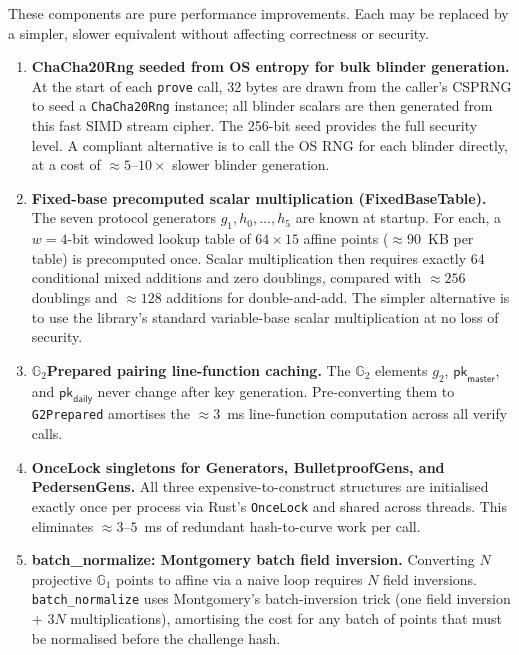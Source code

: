 \documentclass[11pt]{article}
\theoremstyle{definitionstyle}
\theoremstyle{plain}
\begin{document}
These components are pure performance improvements.  Each may be replaced by
a simpler, slower equivalent without affecting correctness or security.

\begin{enumerate}[leftmargin=*,label=\textbf{O\arabic*.}]

\item \textbf{ChaCha20Rng seeded from OS entropy for bulk blinder generation.}
  At the start of each \texttt{prove} call, 32 bytes are drawn from the
  caller's CSPRNG to seed a \texttt{ChaCha20Rng} instance; all blinder
  scalars are then generated from this fast SIMD stream cipher.  The 256-bit
  seed provides the full security level.  A compliant alternative is to call
  the OS RNG for each blinder directly, at a cost of $\approx 5$--$10\times$
  slower blinder generation.

\item \textbf{Fixed-base precomputed scalar multiplication (FixedBaseTable).}
  The seven protocol generators $g_1, h_0, \ldots, h_5$ are known at startup.
  For each, a $w=4$-bit windowed lookup table of $64 \times 15$ affine points
  ($\approx 90$~KB per table) is precomputed once.  Scalar multiplication
  then requires exactly 64 conditional mixed additions and zero doublings,
  compared with $\approx 256$ doublings and $\approx 128$ additions for
  double-and-add.  The simpler alternative is to use the library's standard
  variable-base scalar multiplication at no loss of security.

\item \textbf{$\mathbb{G}_2$Prepared pairing line-function caching.}
  The $\mathbb{G}_2$ elements $g_2$, $\mathsf{pk}_{\mathsf{master}}$, and
  $\mathsf{pk}_{\mathsf{daily}}$ never change after key generation.
  Pre-converting them to \texttt{G2Prepared} amortises the $\approx 3$~ms
  line-function computation across all verify calls.

\item \textbf{OnceLock singletons for Generators, BulletproofGens, and PedersenGens.}
  All three expensive-to-construct structures are initialised exactly once
  per process via Rust's \texttt{OnceLock} and shared across threads.  This
  eliminates $\approx 3$--$5$~ms of redundant hash-to-curve work per call.

\item \textbf{batch\_normalize: Montgomery batch field inversion.}
  Converting $N$ projective $\mathbb{G}_1$ points to affine via a naive loop
  requires $N$ field inversions.  \texttt{batch\_normalize} uses Montgomery's
  batch-inversion trick (one field inversion $+$ $3N$ multiplications),
  amortising the cost for any batch of points that must be normalised before
  the challenge hash.


\end{enumerate}
\end{document}
